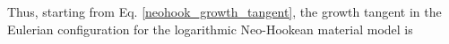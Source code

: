 \documentclass[10pt,letterpaper,oneside]{report}
\newcommand{\ten}[1]{\mbox{\boldmath $#1$}{}}
\newcommand{\tenf}[1]{\mbox{{\sffamily{\bfseries {#1}}}}}
\newcommand{\scas}[1]{\mbox{{\scriptsize{${\rm{#1}}$}}}{}}
\begin{document}
Thus, starting from Eq. \ref{neohook_growth_tangent}, the growth tangent in the Eulerian configuration for the logarithmic Neo-Hookean material model is
\begin{align}

\end{align}
\end{document}

